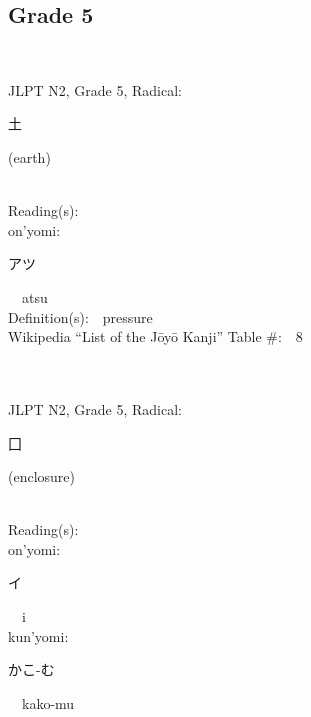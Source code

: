 \subsection*{Grade 5 }
  \label{P1-5}
\begin{multicols}{2}
{\fontsize{34pt}{40pt}  }\ \ \\  %
{JLPT N2, Grade 5, Radical:\ \ {\begin{CJK}{UTF8}{min} 土 \end{CJK}} (earth) } \\
Reading(s):\ \ \\
{\hspace*{1em}}on'yomi:\ \ \\
{\hspace*{2em}}{\begin{CJK}{UTF8}{min} アツ \end{CJK}}\ \ atsu\ \ \\
Definition(s):\ \ pressure \\
Wikipedia ``List of the J\=oy\=o Kanji'' Table \#:\ \ 8 \\
\ \ \\
{\fontsize{34pt}{40pt}  }\ \ \\  %
{JLPT N2, Grade 5, Radical:\ \ {\begin{CJK}{UTF8}{min} 囗 \end{CJK}} (enclosure) } \\
Reading(s):\ \ \\
{\hspace*{1em}}on'yomi:\ \ \\
{\hspace*{2em}}{\begin{CJK}{UTF8}{min} イ \end{CJK}}\ \ i\ \ \\
{\hspace*{1em}}kun'yomi:\ \ \\
{\hspace*{2em}}{\begin{CJK}{UTF8}{min} かこ-む \end{CJK}}\ \ kako-mu\ \ \\

\end{multicols}
